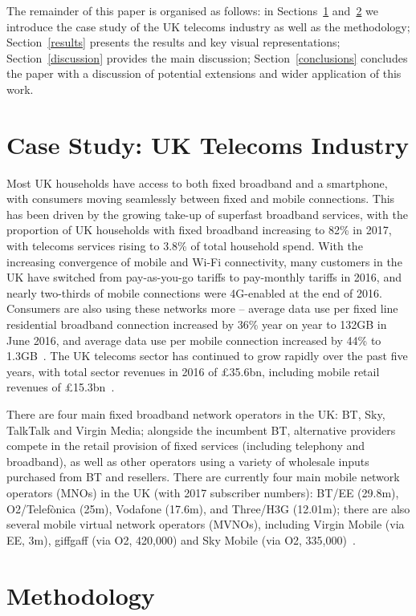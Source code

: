 \documentclass[sigconf]{acmart}
\begin{document}
The remainder of this paper is organised as follows: in
Sections~\ref{casestudy} and~\ref{method} we introduce the case study
of the UK telecoms industry as well as the methodology;
Section~\ref{results} presents the results and key visual
representations; Section~\ref{discussion} provides the main
discussion; Section~\ref{conclusions} concludes the paper with a
discussion of potential extensions and wider application of this work.

\section{Case Study: UK Telecoms Industry}\label{casestudy}

Most UK households have access to both fixed broadband and a
smartphone, with consumers moving seamlessly between fixed and mobile
connections. This has been driven by the growing take-up of superfast
broadband services, with the proportion of UK households with fixed
broadband increasing to 82\% in 2017, with telecoms services rising to
3.8\% of total household spend. With the increasing convergence of
mobile and Wi-Fi connectivity, many customers in the UK have switched
from pay-as-you-go tariffs to pay-monthly tariffs in 2016, and nearly
two-thirds of mobile connections were 4G-enabled at the end of
2016. Consumers are also using these networks more -- average data use
per fixed line residential broadband connection increased by 36\% year
on year to 132GB in June 2016, and average data use per mobile
connection increased by 44\% to 1.3GB~\cite{ofcom:2017}. The UK
telecoms sector has continued to grow rapidly over the past five
years, with total sector revenues in 2016 of \pounds35.6bn, including
mobile retail revenues of \pounds15.3bn~\cite{ofcom:2017}.

There are four main fixed broadband network operators in the UK: BT,
Sky, TalkTalk and Virgin Media; alongside the incumbent BT,
alternative providers compete in the retail provision of fixed
services (including telephony and broadband), as well as other
operators using a variety of wholesale inputs purchased from BT and
resellers. There are currently four main mobile network operators
(MNOs) in the UK (with 2017 subscriber numbers): BT/EE (29.8m),
O2/Telef\`{o}nica (25m), Vodafone (17.6m), and Three/H3G (12.01m);
there are also several mobile virtual network operators (MVNOs),
including Virgin Mobile (via EE, 3m), giffgaff (via O2, 420,000) and
Sky Mobile (via O2, 335,000)~\cite{ecdpr:2017}.


\section{Methodology}\label{method}
\end{document}
